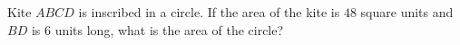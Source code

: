 Kite $ABCD$ is inscribed in a circle. If the area of the kite is $48$ square units and $BD$ is $6$ units long, what is the area of the circle?

